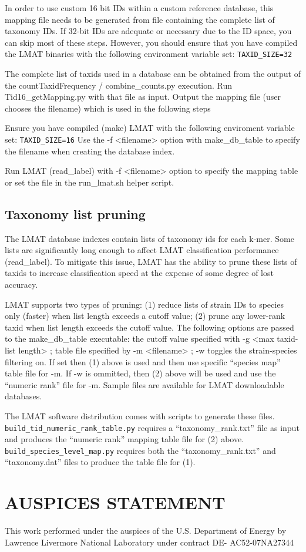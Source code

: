 \documentclass[11pt]{article}
\begin{document}
In order to use custom 16 bit IDs within a custom reference database, this mapping file  needs to be generated from file containing the complete list of taxonomy IDs.  If 32-bit IDs are adequate or necessary due to the ID space, you can skip most of these steps.  However, you should ensure that you have compiled the LMAT binaries with the following environment variable set:  \texttt{TAXID\_SIZE=32}  

  The complete list of taxids used in a database can be obtained from the output of the countTaxidFrequency / combine\_counts.py execution.  Run Tid16_getMapping.py with that file as input.  Output the mapping file (user chooses the filename) which is used in the following steps

Ensure you have compiled (make) LMAT with the following enviroment variable set:  \texttt{TAXID\_SIZE=16}
Use the -f <filename> option with make\_db\_table to specify the filename when creating the database index.

Run LMAT (read\_label) with -f <filename> option to specify the mapping table or set the file in the run\_lmat.sh helper script.

\subsection{Taxonomy list pruning}

The LMAT database indexes contain lists of taxonomy ids for each k-mer.  Some lists are significantly long enough to affect LMAT classification performance (read\_label).  To mitigate this issue, LMAT has the ability to prune these lists of taxids to increase classification speed at the expense of some degree of lost accuracy.

 LMAT supports two types of pruning: (1) reduce lists of strain IDs to species only (faster) when list length exceeds a cutoff value;  (2) prune any lower-rank taxid when list length exceeds the cutoff value.   The following options are passed to the make\_db\_table executable:
the cutoff value specified with -g <max taxid-list length> ;  table file specified by -m <filename> ; -w toggles the strain-species filtering on.  If set then (1) above is used and then use specific ``species map'' table file for -m.  If -w is ommitted, then (2) above will be used and use the ``numeric rank'' file for -m.  Sample files are available for LMAT downloadable databases.

The LMAT software distribution comes with scripts to generate these files.  \texttt{build_tid_numeric_rank_table.py} requires a ``taxonomy\_rank.txt'' file as input and produces the ``numeric rank'' mapping table file for (2) above.  \texttt{build\_species\_level\_map.py}  requires both the ``taxonomy\_rank.txt'' and  ``taxonomy.dat'' files to  produce the table file for (1).


\section{AUSPICES STATEMENT}

This work performed under the auspices of the U.S. Department of
Energy by Lawrence Livermore National Laboratory under contract DE-
AC52-07NA27344
\end{document}
